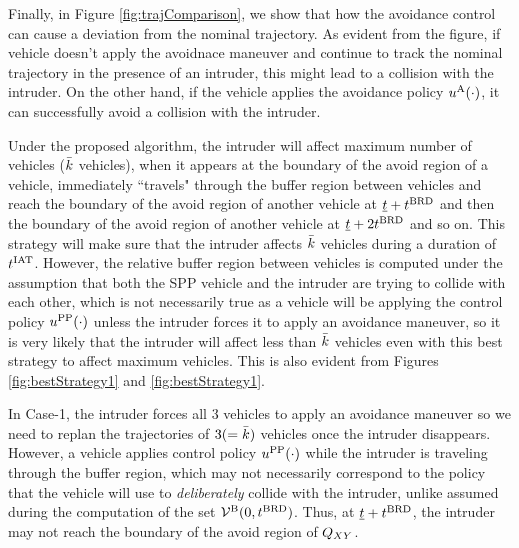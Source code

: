 Finally, in Figure \ref{fig:trajComparison}, we show that how the avoidance control can cause a deviation from the nominal trajectory. As evident from the figure, if vehicle doesn't apply the avoidnace maneuver and continue to track the nominal trajectory in the presence of an intruder, this might lead to a collision with the intruder. On the other hand, if the vehicle applies the avoidance policy $u^{\text{A}}(\cdot)$, it can successfully avoid a collision with the intruder.  

Under the proposed algorithm, the intruder will affect maximum number of vehicles ($\bar{k}$ vehicles), when it appears at the boundary of the avoid region of a vehicle, immediately ``travels" through the buffer region between vehicles and reach the boundary of the avoid region of another vehicle at $\underline{t} + t^\text{BRD}$ and then the boundary of the avoid region of another vehicle at $\underline{t} + 2t^\text{BRD}$ and so on. This strategy will make sure that the intruder affects $\bar{k}$ vehicles during a duration of $t^\text{IAT}$. However, the relative buffer region between vehicles is computed under the assumption that both the SPP vehicle and the intruder are trying to collide with each other, which is not necessarily true as a vehicle will be applying the control policy $u^{\text{PP}}(\cdot)$ unless the intruder forces it to apply an avoidance maneuver, so it is very likely that the intruder will affect less than $\bar{k}$ vehicles even with this best strategy to affect maximum vehicles. This is also evident from Figures \ref{fig:bestStrategy1} and \ref{fig:bestStrategy1}. 

In Case-1, the intruder forces all 3 vehicles to apply an avoidance maneuver so we need to replan the trajectories of $3 (= \bar{k})$ vehicles once the intruder disappears. However, a vehicle applies control policy $u^{\text{PP}}(\cdot)$ while the intruder is traveling through the buffer region, which may not necessarily correspond to the policy that the vehicle will use to \textit{deliberately} collide with the intruder, unlike assumed during the computation of the set $\mathcal{V}^{\text{B}}(0, t^\text{BRD})$. Thus, at $\underline{t} + t^\text{BRD}$, the intruder may not reach the boundary of the avoid region of $Q_{XY}$.         

